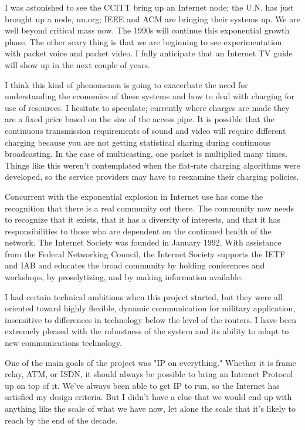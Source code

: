 \documentclass[10pt,a4paper]{scrartcl}
\begin{document}
I was astonished to see the CCITT bring up an Internet node; the U.N. has just brought up a node, un.org; IEEE and ACM are bringing their systems up. We are well beyond critical mass now. The 1990s will continue this exponential growth phase. The other scary thing is that we are beginning to see experimentation with packet voice and packet video. I fully anticipate that an Internet TV guide will show up in the next couple of years.

I think this kind of phenomenon is going to exacerbate the need for understanding the economics of these systems and how to deal with charging for use of resources. I hesitate to speculate; currently where charges are made they are a fixed price based on the size of the access pipe. It is possible that the continuous transmission requirements of sound and video will require different charging because you are not getting statistical sharing during continuous broadcasting. In the case of multicasting, one packet is multiplied many times. Things like this weren't contemplated when the flat-rate charging algorithms were developed, so the service providers may have to reexamine their charging policies.

Concurrent with the exponential explosion in Internet use has come the recognition that there is a real community out there. The community now needs to recognize that it exists, that it has a diversity of interests, and that it has responsibilities to those who are dependent on the continued health of the network. The Internet Society was founded in January 1992. With assistance from the Federal Networking Council, the Internet Society supports the IETF and IAB and educates the broad community by holding conferences and workshops, by proselytizing, and by making information available.

I had certain technical ambitions when this project started, but they were all oriented toward highly flexible, dynamic communication for military application, insensitive to differences in technology below the level of the routers. I have been extremely pleased with the robustness of the system and its ability to adapt to new communications technology.

One of the main goals of the project was "IP on everything." Whether it is frame relay, ATM, or ISDN, it should always be possible to bring an Internet Protocol up on top of it. We've always been able to get IP to run, so the Internet has satisfied my design criteria. But I didn't have a clue that we would end up with anything like the scale of what we have now, let alone the scale that it's likely to reach by the end of the decade.
\end{document}
